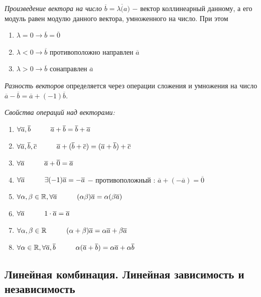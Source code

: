 \begin{definition}
	\textit{Произведение вектора на число} $\overline{b} = \lambda\overline(a)$ $-$ вектор коллинеарный данному, а его модуль равен модулю данного вектора, умноженного на число. При этом
	\begin{enumerate}
		\item $\lambda = 0 \longrightarrow \overline{b} = \overline{0}$
		\item $\lambda < 0 \longrightarrow \overline{b}$ противоположно направлен $\overline{a}$
		\item $\lambda > 0 \longrightarrow \overline{b}$ сонаправлен $\overline{a}$
	\end{enumerate}
\end{definition}

\begin{definition}
	\textit{Разность векторов} определяется через операции сложения и умножения на число $\overline{a} - \overline{b} = \overline{a} + (-1)\overline{b}$.
\end{definition}

\textit{Свойства операций над векторами:}
\begin{enumerate}
	\item $\forall\overline{a},\overline{b}\hspace*{1cm}\overline{a} + \overline{b} = \overline{b} + \overline{a}$
	\item $\forall\overline{a},\overline{b},\overline{c}\hspace*{1cm}\overline{a} + (\overline{b} + \overline{c}) = (\overline{a} + \overline{b}) + \overline{c}$
	\item $\forall\overline{a}\hspace*{1cm}\overline{a} + \overline{0} = \overline{a}$
	\item $\forall\overline{a}\hspace*{1cm}\exists(-1)\overline{a} = -\overline{a}$ $-$ противоположный : $\overline{a} + (-\overline{a}) = \overline{0}$
	\item $\forall \alpha,\beta\in\mathbb{R},\forall\overline{a}\hspace*{1cm}(\alpha\beta)\overline{a}=\alpha(\beta\overline{a})$
	\item$\forall\overline{a}\hspace*{1cm}1\cdot\overline{a}=\overline{a}$
	\item$\forall\alpha,\beta\in\mathbb{R}\hspace*{1cm}(\alpha + \beta)\overline{a} = \alpha\overline{a}+\beta\overline{a}$
	\item$\forall\alpha\in\mathbb{R},\forall\overline{a},\overline{b}\hspace*{1cm}\alpha(\overline{a}+\overline{b})=\alpha\overline{a}+\alpha\overline{b}$
\end{enumerate}
\subsection{Линейная комбинация. Линейная зависимость и независимость}

